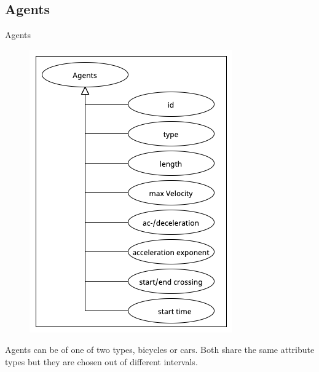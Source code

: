 \subsection{Agents}
\begin{frame}{Agents}

        \begin{figure}
        \centering
            \vspace{-0.5cm}
            \includegraphics[width=\linewidth]{./Images/Agents.png}
        \end{figure} 
        
        Agents can be of one of two types, bicycles or cars. Both share the same attribute types but they are chosen out of different intervals.


\end{frame}
